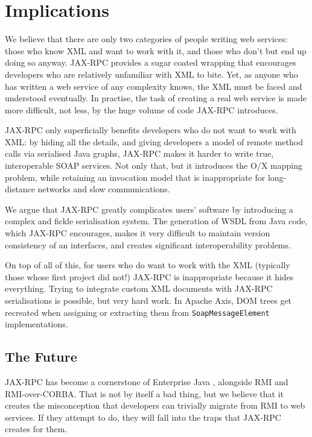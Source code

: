\section{Implications}
\label{implications}


We believe that there are only two categories of people writing web
services: those who know XML and want to work with it, and those who
don't but end up doing so anyway. JAX-RPC provides a sugar coated
wrapping that encourages developers who are relatively unfamiliar with
XML to bite. Yet, as anyone who has written a web service of any
complexity knows, the XML must be faced and understood eventually. In
practise, the task of creating a real web service is made more
difficult, not less, by the huge volume of code JAX-RPC introduces.

JAX-RPC only superficially benefits developers who do not want to work
with XML: by hiding all the details, and giving developers a model of
remote method calls via serialised Java graphs, JAX-RPC makes it harder
to write true, interoperable SOAP services. Not only that, but it
introduces the O/X mapping problem, while retaining an invocation model
that is inappropriate for long-distance networks and slow
communications.

We argue that JAX-RPC greatly complicates users' software by introducing a
complex and fickle serialisation system. The generation of WSDL from Java code,
which JAX-RPC encourages, makes it very difficult to maintain version
consistency of an interfaces, and creates significant interoperability problems.

On top of all of this, for users who do want to work with the XML
(typically those whose first project did not!) JAX-RPC is
inappropriate because it hides everything. Trying to integrate custom
XML documents with JAX-RPC serialisations is possible, but very hard
work. In Apache Axis, DOM trees get recreated when assigning or
extracting them from {\tt SoapMessageElement} implementations.


\subsection{The Future}
\label{implications:future}

JAX-RPC has become a cornerstone of Enterprise Java
\cite{spec:J2EE-14}, alongside RMI and RMI-over-CORBA. That is not by
itself a bad thing, but we believe that it creates the misconception
that developers can trivially migrate from RMI to web services. If
they attempt to do, they will fall into the traps that JAX-RPC creates
for them.


